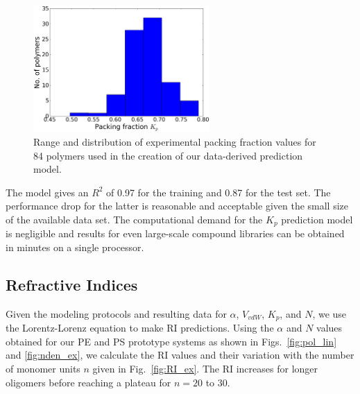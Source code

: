 \begin{figure}[htbp] 
	\centering
	\includegraphics[width=0.6\textwidth]{Chapter-2/Figures/Kp_hist.eps}
	\caption{Range and distribution of experimental packing fraction values for 84 polymers used in the creation of our data-derived prediction model.} 
	\label{fig:Kp_hist} 
\end{figure} 

The model gives an $R^2$ of 0.97 for the training and 0.87 for the test set. The performance drop for the latter is reasonable and acceptable given the small size of the available data set.
The computational demand for the $K_p$ prediction model is negligible and results for even large-scale compound libraries can be obtained in minutes on a single processor. 


\subsection{Refractive Indices}
\label{subsec:RI_results}
Given the modeling protocols and resulting data for $\alpha$, $V_{vdW}$, $K_p$, and $N$, we use the Lorentz-Lorenz equation to make RI predictions.    
Using the $\alpha$ and $N$ values obtained for our PE and PS prototype systems as shown in Figs.\ \ref{fig:pol_lin} and \ref{fig:nden_ex}, we calculate the RI values and their variation with the number of monomer units $n$ given in Fig.\ \ref{fig:RI_ex}. The RI increases for longer oligomers before reaching a plateau for $n=20$ to $30$. 


